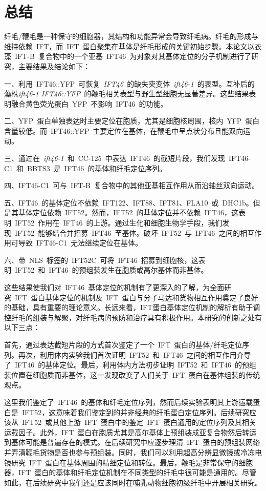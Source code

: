\chapter{总\quad 结}
\renewcommand{\leftmark}{总\quad 结}
纤毛/鞭毛是一种保守的细胞器，其结构和功能异常会导致纤毛病。纤毛的形成与维持依赖\ IFT，而\ IFT\ 蛋白聚集在基体是纤毛形成的关键初始步骤。本论文以衣藻\ IFT-B\ 复合物中的一个亚基\ IFT46\ 为对象对其基体定位的分子机制进行了研究，主要结果及结论如下：

一、利用\ IFT46::YFP\ 可恢复\ \textit{IFT46}\ 的缺失突变体\ \textit{ift46-1}\ 的表型。互补后的
藻株\textit{ift46-1 IFT46::YFP}\ 的鞭毛相关表型与野生型细胞无显著差异。这些结果表明融合黄色荧光蛋白\ YFP\ 不影响\ IFT46\ 的功能。

二、YFP\ 蛋白单独表达时主要定位在胞质，尤其是细胞核周围，核内\ YFP\ 蛋白含量较低。而\ IFT46::YFP\ 主要定位在基体，在鞭毛中呈点状分布且能双向运动。

三、通过在\ \textit{ift46-1}\ 和\ CC-125\ 中表达\ IFT46\ 的截短片段，我们发现\ IFT46-C1\ 和\ BBTS3\ 是\ IFT46\ 的基体和纤毛定位序列。

四、IFT46-C1\ 可与\ IFT-B\ 复合物中的其他亚基相互作用从而沿轴丝双向运动。

五、IFT46\ 的基体定位不依赖\ IFT122、IFT88、IFT81、FLA10\ 或\ DHC1b。但是其基体定位依赖\ IFT52。然而，IFT52\ 的基体定位并不依赖\ IFT46，这表明\ IFT52\ 作用在\ IFT46\ 的上游。通过生化和细胞生物学手段，我们发现\ IFT52\ 能够结合并招募\ IFT46\ 至基体。破坏\ IFT52\ 与\ IFT46\ 之间的相互作用可导致\ IFT46-C1\ 无法继续定位在基体。

六、带\ NLS\ 标签的\ IFT52C\ 可将\ IFT46\ 招募到细胞核，这表明\ IFT52\ 和\ IFT46\ 的预组装发生在胞质或高尔基体而非基体。

这些结果使我们对\ IFT46\ 基体定位的机制有了更深入的了解，为全面研究\ IFT\ 蛋白基体定位的机制及\ IFT\ 蛋白与分子马达和货物相互作用奠定了良好的基础，具有重要的理论意义。长远来看，IFT蛋白基体定位机制的解析有助于调控纤毛的组装与解聚，对纤毛病的预防和治疗具有积极作用。本研究的创新之处有以下三点：

首先，通过表达截短片段的方式首次鉴定了一个\ IFT\ 蛋白的基体/纤毛定位序列。再次，利用体内实验我们首次证明\ IFT52\ 和\ IFT46\ 之间的相互作用介导了\ IFT46\ 的基体定位。最后，利用体内方法初步证明\ IFT52\ 和\ IFT46\ 的预组装位置在细胞质而非基体，这一发现改变了人们关于\ IFT\ 蛋白在基体组装的传统观点。

这里我们鉴定了\ IFT46\ 的基体和纤毛定位序列，然而后续实验表明其上游运载蛋白是\ IFT52，这意味着我们鉴定到的并非经典的纤毛蛋白定位序列。后续研究应该从\ IFT52\ 或其他上游\ IFT\ 蛋白中的鉴定\ IFT\ 蛋白通用的定位序列及其相关运载因子。此外，IFT\ 蛋白在胞质尤其是高尔基体上预组装成亚复合物然后转运到基体可能是普遍存在的模式。在后续研究中应逐步理清\ IFT\ 蛋白的预组装网络并弄清鞭毛货物是否也参与预组装。同时，我们可以利用超高分辨显微镜或冷冻电镜研究\ IFT\ 蛋白在基体周围的精细定位和转位。最后，鞭毛是非常保守的细胞器，IFT\ 蛋白的基体和纤毛定位机制在不同类型的纤毛中很可能是通用的。尽管如此，在后续研究中我们还是应该同时在哺乳动物细胞初级纤毛中开展相关研究。
